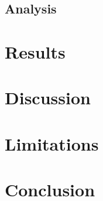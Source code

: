 \documentclass[11pt]{article}
\begin{document}
\subsection{Analysis}

\section{Results}

\section{Discussion}

\section{Limitations}

\section{Conclusion}





\end{document}
